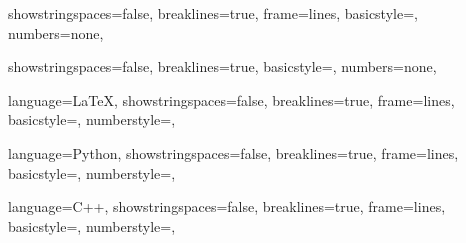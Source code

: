 \newlength{\numwidth}
\makeatletter
\newcommand{\setlinenum}[1]
{
  \setlength{\numwidth}{\widthof{\footnotesize{\lst@numberstyle{#1}}}}
  \def\lst@PlaceNumber{%
    \makebox[\numwidth+1em][l]{%
      \makebox[\numwidth][r]{\footnotesize\lst@numberstyle{\thelstnumber}}
    }
  }
}
\makeatother
\setlinenum{9} %

{
  showstringspaces=false,
  breaklines=true,
  frame=lines,
  basicstyle=\footnotesize\ttfamily,
  numbers=none,
}

{
  showstringspaces=false,
  breaklines=true,
  basicstyle=\footnotesize\ttfamily,
  numbers=none,
}

{
  language=LaTeX,
  showstringspaces=false,
  breaklines=true,
  frame=lines,
  basicstyle=\footnotesize\ttfamily,
  numberstyle=\footnotesize\ttfamily,
}

{
  language=Python,
  showstringspaces=false,
  breaklines=true,
  frame=lines,
  basicstyle=\footnotesize\ttfamily,
  numberstyle=\footnotesize\ttfamily,
}

{
  language=C++,
  showstringspaces=false,
  breaklines=true,
  frame=lines,
  basicstyle=\footnotesize\ttfamily,
  numberstyle=\footnotesize\ttfamily,
}
